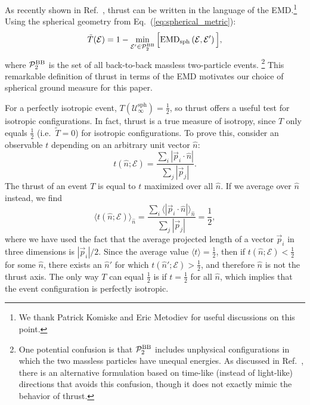 \documentclass[letterpaper,11pt]{article}
\DeclareRobustCommand{\Eq}[1]{Eq.~(\ref{#1})}
\DeclareRobustCommand{\Ref}[1]{Ref.~\cite{#1}}
\begin{document}
As recently shown in \Ref{Komiske:2020qhg}, thrust can be written in the language of the EMD.\footnote{We thank Patrick Komiske and Eric Metodiev for useful discussions on this point.}
%
Using the spherical geometry from \Eq{eq:spherical_metric}:
%
\begin{equation}
\label{eq:thrust_as_EMD}
\tilde{T}(\mathcal{E}) = 1- \min_{\mathcal{E}' \in \mathcal{P}_2^{\rm BB}} \Big[\text{EMD}_\text{sph} \left(\mathcal{E}, \mathcal{E}' \right) \Big],
\end{equation}
%
where $\mathcal{P}_2^{\rm BB}$ is the set of all back-to-back massless two-particle events.%
%
\footnote{One potential confusion is that $\mathcal{P}_2^{\rm BB}$ includes unphysical configurations in which the two massless particles have unequal energies.  As discussed in \Ref{Komiske:2020qhg}, there is an alternative formulation based on time-like (instead of light-like) directions that avoids this confusion, though it does not exactly mimic the behavior of thrust.}
%
This remarkable definition of thrust in terms of the EMD motivates our choice of spherical ground measure for this paper.


For a perfectly isotropic event, $T(\mathcal{U}^\text{sph}_\infty) = \frac{1}{2}$, so thrust offers a useful test for isotropic configurations.
%
In fact, thrust is a true measure of isotropy, since $T$ only equals $\frac{1}{2}$ (i.e.\ $\widetilde{T} = 0$) for isotropic configurations.
%
To prove this, consider an observable $t$ depending on an arbitrary unit vector $\hat{n}$: 
%
\begin{equation}
t\left(\hat{n}; \mathcal{E}\right) = \frac{\sum_i | \vec{p}_i \cdot \hat{n}| }{\sum_j |\vec{p}_j|}.
\end{equation}
%
The thrust of an event $T$ is equal to $t$ maximized over all $\hat{n}$.
%
If we average over $\hat{n}$ instead, we find
%
\begin{equation}
\langle t(\hat{n}; \mathcal{E}) \rangle_{\hat{n}} = \frac{\sum_i  \langle | \vec{p}_i \cdot \hat{n}| \rangle_{\hat{n}}}{\sum_j |\vec{p}_j|} = \frac{1}{2},
\end{equation}
% 
where we have used the fact that the average projected length of a vector $\vec{p}_i$ in three dimensions is $|\vec{p}_i|/2$.
%
Since the average value $\langle t \rangle =  \frac{1}{2}$, then if $t(\hat{n}; \mathcal{E}) <  \frac{1}{2}$ for some $\hat{n}$, there exists an $\hat{n}'$ for which $t(\hat{n}';  \mathcal{E}) >  \frac{1}{2}$, and therefore $\hat{n}$ is not the thrust axis. 
%
The only way $T$ can equal $\frac{1}{2}$ is if $t =  \frac{1}{2}$ for all $\hat{n}$, which implies that the event configuration is perfectly isotropic.
\end{document}
